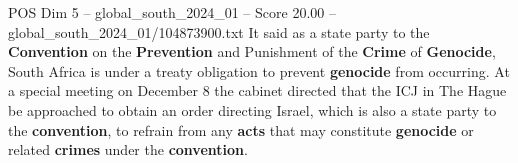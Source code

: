 \begin{textsample}{POS Dim 5 – global\_south\_2024\_01 – Score 20.00 – global\_south\_2024\_01/104873900.txt}
It said as a state party to the \textbf{Convention} on the \textbf{Prevention} and Punishment of the \textbf{Crime} of \textbf{Genocide}, South Africa is under a treaty obligation to prevent \textbf{genocide} from occurring.
At a special meeting on December 8 the cabinet directed that the ICJ in The Hague be approached to obtain an order directing Israel, which is also a state party to the \textbf{convention}, to refrain from any \textbf{acts} that may constitute \textbf{genocide} or related \textbf{crimes} under the \textbf{convention}.

\end{textsample}
